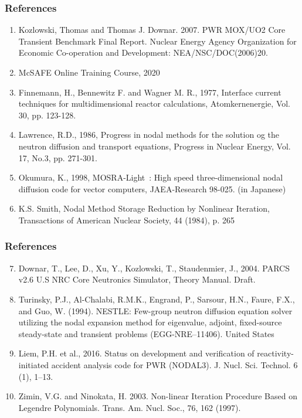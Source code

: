\documentclass{beamer}
\begin{document}
\begin{frame}
\frametitle{References}
\begin{enumerate}
  \item Kozlowski, Thomas and Thomas J. Downar. 2007. PWR MOX/UO2 Core Transient Benchmark Final Report. Nuclear Energy Agency Organization for Economic Co-operation and Development: NEA/NSC/DOC(2006)20.
  \item McSAFE Online Training Course, 2020
  \item Finnemann, H., Bennewitz F. and Wagner M. R., 1977, Interface current techniques for multidimensional reactor calculations, Atomkernenergie, Vol. 30, pp. 123-128.
  \item Lawrence, R.D., 1986, Progress in nodal methods for the solution og the neutron diffusion and transport equations, Progress in Nuclear Energy, Vol. 17, No.3, pp. 271-301.
  \item Okumura, K., 1998, MOSRA-Light : High speed three-dimensional nodal diffusion code for vector computers, JAEA-Research 98-025. (in Japanese)
  \item K.S. Smith, Nodal Method Storage Reduction by Nonlinear Iteration, Transactions of American Nuclear Society, 44 (1984), p. 265
\end{enumerate}
\end{frame}

\begin{frame}
\frametitle{References}
\begin{enumerate}
  \setcounter{enumi}{6}
  \item Downar, T., Lee, D., Xu, Y., Kozlowski, T., Staudenmier, J., 2004. PARCS v2.6 U.S NRC Core Neutronics Simulator, Theory Manual. Draft.
  \item Turinsky, P.J., Al-Chalabi, R.M.K., Engrand, P., Sarsour, H.N., Faure, F.X., and Guo, W. (1994). NESTLE: Few-group neutron diffusion equation solver utilizing the nodal expansion method for eigenvalue, adjoint, fixed-source steady-state and transient problems (EGG-NRE--11406). United States
  \item Liem, P.H. et al., 2016. Status on development and verification of reactivity-initiated accident analysis code for PWR (NODAL3). J. Nucl. Sci. Technol. 6 (1), 1–13.
  \item Zimin, V.G. and Ninokata, H. 2003. Non-linear Iteration Procedure Based on Legendre Polynomials. Trans. Am. Nucl. Soc., 76, 162 (1997).
\end{enumerate}
\end{frame}
\end{document}
